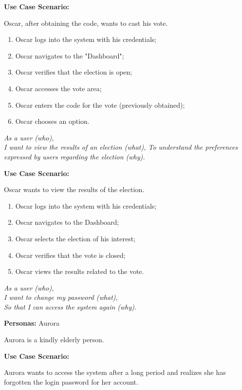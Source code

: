 \documentclass{scrartcl}
\begin{document}
\textbf{Use Case Scenario:}

Oscar, after obtaining the code, wants to cast his vote.

\begin{enumerate}
    \item Oscar logs into the system with his credentials;
    \item Oscar navigates to the "Dashboard";
    \item Oscar verifies that the election is open;
    \item Oscar accesses the vote area;
    \item Oscar enters the code for the vote (previously obtained);
    \item Oscar chooses an option.
\end{enumerate}

\vspace*{0.2cm}
\noindent
\emph{%
    As a user (who), \\
    I want to view the results of an election (what),
    To understand the preferences expressed by users regarding the election (why).
}
\vspace*{0.2cm}

\textbf{Use Case Scenario:}

Oscar wants to view the results of the election.

\begin{enumerate}
    \item Oscar logs into the system with his credentials;
    \item Oscar navigates to the Dashboard;
    \item Oscar selects the election of his interest;
    \item Oscar verifies that the vote is closed;
    \item Oscar views the results related to the vote.
\end{enumerate}

\vspace*{0.5cm}
\noindent
\emph{%
    As a user (who), \\
    I want to change my password (what), \\
    So that I can access the system again (why).
}
\vspace*{0.2cm}

\textbf{Personas:} Aurora

Aurora is a kindly elderly person. 

\textbf{Use Case Scenario:}

Aurora wants to access the system after a long period and realizes she has forgotten the login password for her account.
\end{document}
